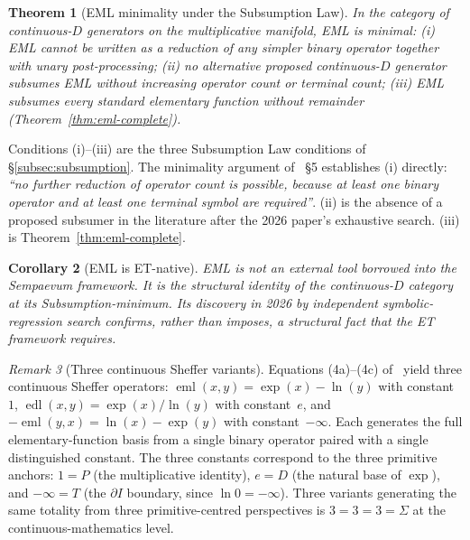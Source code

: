 \documentclass[11pt,a4paper]{article}
\newtheorem{theorem}{Theorem}[section]
\newtheorem{corollary}[theorem]{Corollary}
\theoremstyle{definition}
\theoremstyle{remark}
\newtheorem{remark}[theorem]{Remark}
\begin{document}
\begin{theorem}[EML minimality under the Subsumption Law]\label{thm:eml-minimal}
In the category of continuous-$D$ generators on the multiplicative manifold, EML is minimal: (i) EML cannot be written as a reduction of any simpler binary operator together with unary post-processing; (ii) no alternative proposed continuous-$D$ generator subsumes EML without increasing operator count or terminal count; (iii) EML subsumes every standard elementary function without remainder (Theorem~\ref{thm:eml-complete}).
\end{theorem}

Conditions (i)--(iii) are the three Subsumption Law conditions of \S\ref{subsec:subsumption}. The minimality argument of~\cite{Odrzywolek2026} \S5 establishes (i) directly: \emph{``no further reduction of operator count is possible, because at least one binary operator and at least one terminal symbol are required''}. (ii) is the absence of a proposed subsumer in the literature after the 2026 paper's exhaustive search. (iii) is Theorem~\ref{thm:eml-complete}.

\begin{corollary}[EML is ET-native]
EML is not an external tool borrowed into the Sempaevum framework. It is the structural identity of the continuous-$D$ category at its Subsumption-minimum. Its discovery in 2026 by independent symbolic-regression search confirms, rather than imposes, a structural fact that the ET framework requires.
\end{corollary}

\begin{remark}[Three continuous Sheffer variants]\label{rem:three-sheffers}
Equations (4a)--(4c) of~\cite{Odrzywolek2026} yield three continuous Sheffer operators: $\operatorname{eml}(x,y) = \exp(x)-\ln(y)$ with constant~$1$, $\operatorname{edl}(x,y) = \exp(x)/\ln(y)$ with constant~$e$, and $-\!\operatorname{eml}(y,x) = \ln(x)-\exp(y)$ with constant~$-\infty$. Each generates the full elementary-function basis from a single binary operator paired with a single distinguished constant. The three constants correspond to the three primitive anchors: $1 = P$ (the multiplicative identity), $e = D$ (the natural base of $\exp$), and $-\infty = T$ (the $\partial I$ boundary, since $\ln 0 = -\infty$). Three variants generating the same totality from three primitive-centred perspectives is $3=3=3=\Sigma$ at the continuous-mathematics level.
\end{remark}
\end{document}
